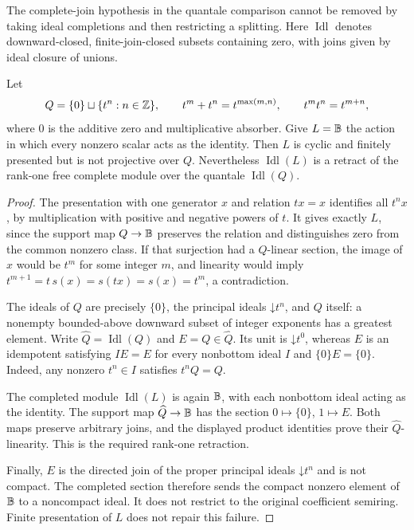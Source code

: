 The complete-join hypothesis in the quantale comparison cannot be
removed by taking ideal completions and then restricting a splitting.
Here $\operatorname{Idl}$ denotes downward-closed, finite-join-closed
subsets containing zero, with joins given by ideal closure of unions.

\begin{proposition}
\label{prop:completion-projectivity-boundary}
Let
\[
 Q=\{0\}\sqcup\{t^n:n\in\mathbb Z\},\qquad
 t^m+t^n=t^{\max(m,n)},\qquad t^m t^n=t^{m+n},
\]
where $0$ is the additive zero and multiplicative absorber. Give
$L=\mathbb B$ the action in which every nonzero scalar acts as the identity.
Then $L$ is cyclic and finitely presented but is not projective over
$Q$. Nevertheless $\operatorname{Idl}(L)$ is a retract of the rank-one
free complete module over the quantale $\operatorname{Idl}(Q)$.
\end{proposition}
\begin{proof}
The presentation with one generator $x$ and relation $tx=x$ identifies
all $t^n x$, by multiplication with positive and negative powers of $t$.
It gives exactly $L$, since the support map $Q\to\mathbb B$ preserves the
relation and distinguishes zero from the common nonzero class. If that
surjection had a $Q$-linear section, the image of $x$ would be $t^m$ for
some integer $m$, and linearity would imply
$t^{m+1}=t\,s(x)=s(tx)=s(x)=t^m$, a contradiction.

The ideals of $Q$ are precisely $\{0\}$, the principal ideals
$\mathord\downarrow t^n$, and $Q$ itself: a nonempty bounded-above
downward subset of integer exponents has a greatest element. Write
$\widehat Q=\operatorname{Idl}(Q)$ and $E=Q\in\widehat Q$. Its unit is
$\mathord\downarrow t^0$, whereas $E$ is an idempotent satisfying
$IE=E$ for every nonbottom ideal $I$ and $\{0\}E=\{0\}$. Indeed, any
nonzero $t^n\in I$ satisfies $t^n Q=Q$.

The completed module $\operatorname{Idl}(L)$ is again $\mathbb B$, with each
nonbottom ideal acting as the identity. The support map
$\widehat Q\to\mathbb B$ has the section $0\mapsto\{0\}$,
$1\mapsto E$. Both maps preserve arbitrary joins, and the displayed
product identities prove their $\widehat Q$-linearity. This is the
required rank-one retraction.

Finally, $E$ is the directed join of the proper principal ideals
$\mathord\downarrow t^n$ and is not compact. The completed section
therefore sends the compact nonzero element of $\mathbb B$ to a noncompact
ideal. It does not restrict to the original coefficient semiring.
Finite presentation of $L$ does not repair this failure.
\end{proof}


